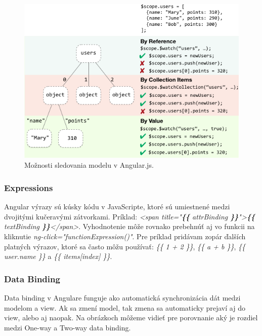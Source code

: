 \begin{figure}[H]
  \centering
  \includegraphics[scale=0.7]{img/angular/concepts-scope-watch-strategies.png}
  \caption{Možnosti sledovania modelu v Angular.js.}
  \label{img-angular-watchl}
\end{figure}

\subsubsection{Expressions}
Angular výrazy sú kúsky kódu v JavaScripte, ktoré sú umiestnené medzi dvojitými kučeravými zátvorkami. Príklad: \textit{<span title="\textbf{\{\{} attrBinding \textbf{\}\}}">\textbf{\{\{} textBinding \textbf{\}\}}</span>}. Vyhodnotenie môže rovnako prebehnúť aj vo funkcii na kliknutie \textit{ng-click="functionExpression()"}.
Pre príklad pridávam zopár ďalších platných výrazov, ktoré sa často môžu používať: \textit{\{\{ 1 + 2 \}\}}, \textit{\{\{ a + b \}\}}, \textit{\{\{ user.name \}\}} a 
\textit{\{\{ items[index] \}\}}.\cite{angular-docs}




\subsubsection{Data Binding}
Data binding v Angulare funguje ako automatická synchronizácia dát medzi modelom a view. Ak sa zmení model, tak zmena sa automaticky prejaví aj do view, alebo aj naopak.
Na obrázkoch môžeme vidieť pre porovnanie aký je rozdiel medzi One-way a Two-way data binding.

